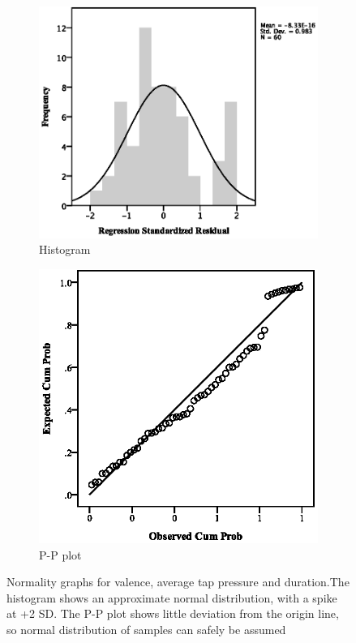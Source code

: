 \par\bigskip
\par\bigskip
\begin{figure}[ht]
\centering
\begin{subfigure}[b]{0.45\textwidth}
    \centering
    \includegraphics[width=\textwidth]{images/normality/valavg/HistValAvg.eps}
    \caption{Histogram}
    \label{fig:histvalavg}
\end{subfigure}
\quad
\begin{subfigure}[b]{0.45\textwidth}
    \centering
    \includegraphics[width=\textwidth]{images/normality/valavg/PPValAvg.eps}
    \caption{P-P plot}
    \label{fig:ppvalavg}
\end{subfigure}
\caption{Normality graphs for valence, average tap pressure and duration.The histogram shows an approximate normal distribution, with a spike at +2 SD. The P-P plot shows little deviation from the origin line, so normal distribution of samples can safely be assumed}
\end{figure}
